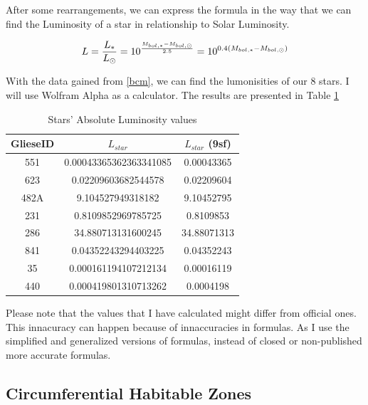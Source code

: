 \documentclass{article}
\begin{document}
After some rearrangements, we can express the formula in the way that we can find the Luminosity of a star in relationship to Solar Luminosity.

\begin{equation}
  L = \frac{L_*}{L_{\odot}} = 10^{\frac{M_{bol, *} - M_{bol, \odot}} {2.5}} = 10^{0.4(M_{bol, *} - M_{bol, \odot})}\\
  \end{equation}

With the data gained from \ref{bcm}, we can find the lumonisities of our 8 stars. I will use Wolfram Alpha as a calculator. The results are presented in Table \ref{lum}    \\

\begin{table}[h]
    \begin{center}
      \caption{Stars' Absolute Luminosity values}
      \begin{tabular}{c | c | c}
        \textbf{GlieseID} & \textbf{$L_{star}$} & \textbf{$L_{star}$} (9sf)\\
        \hline
        551  & 0.00043365362363341085 & 0.00043365 \\
        623  & 0.02209603682544578    & 0.02209604 \\
        482A & 9.104527949318182      & 9.10452795 \\
        231  & 0.8109852969785725     & 0.8109853 \\
        286  & 34.880713131600245     & 34.88071313 \\
        841  & 0.04352243294403225    & 0.04352243 \\
        35   & 0.000161194107212134   & 0.00016119 \\
        440  & 0.000419801310713262   & 0.0004198 \\
      \end{tabular}
      \label{lum}
    \end{center}
  \end{table}

Please note that the values that I have calculated might differ from official ones. This innacuracy can happen because of innaccuracies in formulas. As I use the simplified and generalized versions of formulas, instead of closed or non-published more accurate formulas. 

\subsection{Circumferential Habitable Zones}
\end{document}
